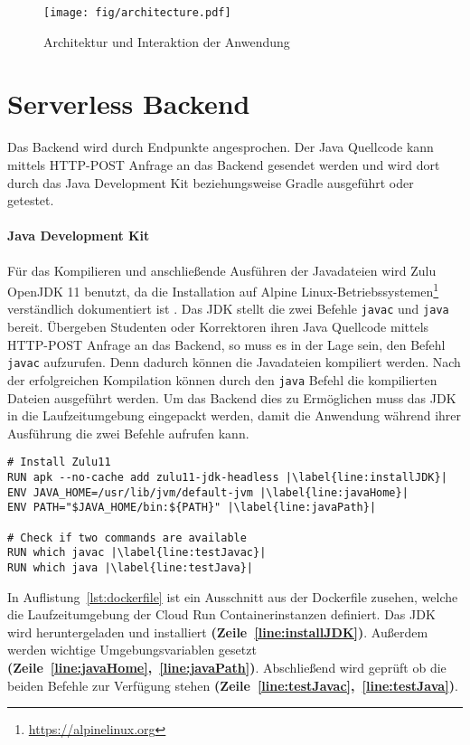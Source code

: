 \begin{figure}
  \centering
  \texttt{[image: fig/architecture.pdf]}
  \caption{Architektur und Interaktion der Anwendung}
  \label{fig:architecture}
\end{figure}

\section{Serverless Backend}
Das Backend wird durch Endpunkte angesprochen.
Der Java Quellcode kann mittels HTTP-POST Anfrage an das
Backend gesendet werden und wird dort durch das Java Development Kit
beziehungsweise Gradle ausgeführt oder getestet.


\paragraph{Java Development Kit} Für das Kompilieren und
anschließende Ausführen der Javadateien wird
Zulu OpenJDK 11 benutzt, da die Installation auf
Alpine Linux-Betriebssystemen\footnote{\url{https://alpinelinux.org}}
verständlich dokumentiert ist \cite{AzulZuluJDK}.
Das JDK stellt die zwei Befehle \texttt{javac} und \texttt{java} bereit.
Übergeben Studenten oder Korrektoren ihren Java Quellcode mittels HTTP-POST Anfrage an
das Backend, so muss es in der Lage sein, den Befehl \texttt{javac}
aufzurufen. Denn dadurch können die Javadateien kompiliert werden.
Nach der erfolgreichen Kompilation können durch den \texttt{java} Befehl die kompilierten Dateien
ausgeführt werden. Um das Backend dies zu Ermöglichen muss das JDK in die Laufzeitumgebung eingepackt
werden, damit die Anwendung während ihrer Ausführung die zwei Befehle aufrufen kann.\\

\begin{lstlisting}[caption={Ausschnitt aus der Dockerfile. Herunterladen und Einrichten des JDK.}, label={lst:dockerfile}, escapechar=|]
# Install Zulu11
RUN apk --no-cache add zulu11-jdk-headless |\label{line:installJDK}|
ENV JAVA_HOME=/usr/lib/jvm/default-jvm |\label{line:javaHome}|
ENV PATH="$JAVA_HOME/bin:${PATH}" |\label{line:javaPath}|

# Check if two commands are available
RUN which javac |\label{line:testJavac}|
RUN which java |\label{line:testJava}|
\end{lstlisting}

In Auflistung~\ref{lst:dockerfile} ist ein Ausschnitt
aus der Dockerfile zusehen, welche die Laufzeitumgebung
der Cloud Run Containerinstanzen definiert. Das JDK wird
heruntergeladen und installiert \textbf{(Zeile~\ref{line:installJDK})}.
Außerdem werden wichtige Umgebungsvariablen
gesetzt \textbf{(Zeile~\ref{line:javaHome},~\ref{line:javaPath})}.
Abschließend wird geprüft ob die beiden Befehle
zur Verfügung stehen \textbf{(Zeile~\ref{line:testJavac},~\ref{line:testJava})}.

